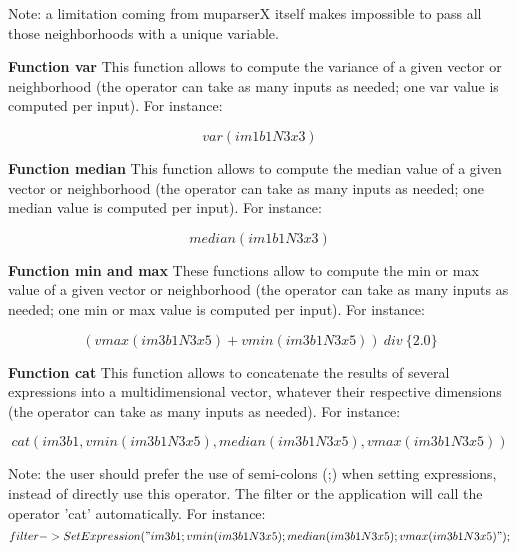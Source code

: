 Note: a limitation coming from muparserX itself makes impossible to pass all those neighborhoods with a unique variable.

\textbf{Function var} \newline
This function allows to compute the variance of a given vector or neighborhood (the operator can take
as many inputs as needed; one var value is computed per input). For instance:

\begin{equation}
	var(im1b1N3x3)
\end{equation} 

\textbf{Function median} \newline
This function allows to compute the median value of a given vector or neighborhood (the operator can take
as many inputs as needed; one median value is computed per input). For instance:

\begin{equation}
	median(im1b1N3x3)
\end{equation}

\textbf{Function min and max} \newline
These functions allow to compute the min or max value of a given vector or neighborhood (the operator can take
as many inputs as needed; one min or max value is computed per input). For instance:

\begin{equation}
	(vmax(im3b1N3x5)+vmin(im3b1N3x5)) ~ div ~ \{2.0\}
\end{equation}

\textbf{Function cat} \newline
This function allows to concatenate the results of several expressions into a multidimensional vector, whatever their respective dimensions (the operator can take
as many inputs as needed). For instance:

\begin{equation}
	cat(im3b1,vmin(im3b1N3x5),median(im3b1N3x5),vmax(im3b1N3x5))
\end{equation}

Note: the user should prefer the use of semi-colons (;) when setting expressions, instead of directly use this operator.
The filter or the application will call the operator 'cat' automatically. For instance:
\begin{equation}
	filter->SetExpression("im3b1 ; vmin(im3b1N3x5) ; median(im3b1N3x5) ; vmax(im3b1N3x5)");
\end{equation} 

